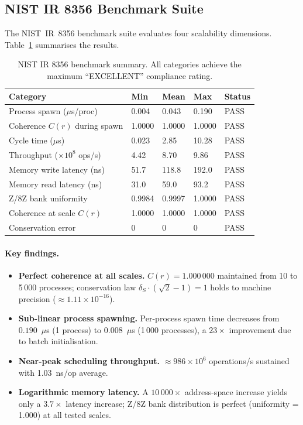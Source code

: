 \documentclass[12pt,a4paper]{article}
\theoremstyle{plain}
\theoremstyle{definition}
\theoremstyle{remark}
\newcommand{\dS}{\delta_S}        %
\begin{document}
\subsection{NIST IR 8356 Benchmark Suite}
\label{sec:nist}

The NIST~IR~8356 benchmark suite evaluates four scalability dimensions.
Table~\ref{tab:nist} summarises the results.

\begin{table}[ht]
\centering
\caption{NIST IR 8356 benchmark summary.  All categories achieve the maximum
``EXCELLENT'' compliance rating.}
\label{tab:nist}
\begin{tabular}{@{}lllll@{}}
\toprule
Category & Min & Mean & Max & Status \\
\midrule
Process spawn ($\mu$s/proc) & 0.004 & 0.043 & 0.190 & PASS \\
Coherence $C(r)$ during spawn & 1.0000 & 1.0000 & 1.0000 & PASS \\
Cycle time ($\mu$s) & 0.023 & 2.85 & 10.28 & PASS \\
Throughput ($\times 10^8$ ops/s) & 4.42 & 8.70 & 9.86 & PASS \\
Memory write latency (ns) & 51.7 & 118.8 & 192.0 & PASS \\
Memory read latency (ns) & 31.0 & 59.0 & 93.2 & PASS \\
Z/8Z bank uniformity & 0.9984 & 0.9997 & 1.0000 & PASS \\
Coherence at scale $C(r)$ & 1.0000 & 1.0000 & 1.0000 & PASS \\
Conservation error & $0$ & $0$ & $0$ & PASS \\
\bottomrule
\end{tabular}
\end{table}

\paragraph{Key findings.}
\begin{itemize}
  \item \textbf{Perfect coherence at all scales.} $C(r) = 1.000\,000$
    maintained from 10 to 5\,000 processes; conservation law
    $\dS\cdot(\sqrt{2}-1)=1$ holds to machine precision
    ($\approx 1.11\times10^{-16}$).
  \item \textbf{Sub-linear process spawning.} Per-process spawn time
    decreases from $0.190$~$\mu$s (1 process) to $0.008$~$\mu$s (1\,000 processes),
    a $23\times$ improvement due to batch initialisation.
  \item \textbf{Near-peak scheduling throughput.} $\approx 986\times10^6$
    operations/s sustained with 1.03~ns/op average.
  \item \textbf{Logarithmic memory latency.} A $10\,000\times$ address-space
    increase yields only a $3.7\times$ latency increase; Z/8Z bank
    distribution is perfect (uniformity = 1.000) at all tested scales.
\end{itemize}
\end{document}
